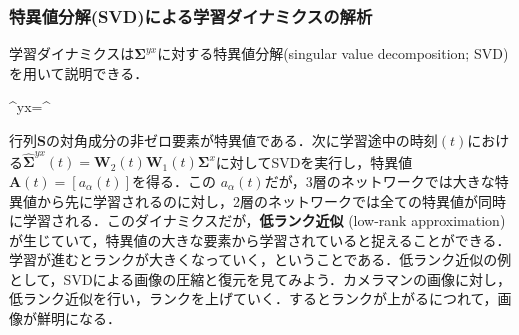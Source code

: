 \subsubsection{特異値分解(SVD)による学習ダイナミクスの解析}
学習ダイナミクスは$ \mathbf{\Sigma}^{yx}$に対する特異値分解(singular value decomposition; SVD)を用いて説明できる．


\mathbf{\Sigma}^{yx}=^\top


行列$ \mathbf{ S}$の対角成分の非ゼロ要素が特異値である．次に学習途中の時刻$(t)$における$\hat{\mathbf{\Sigma}}^{yx}(t)=\mathbf{W}_2 (t) \mathbf{W}_1(t) \mathbf{\Sigma}^{x}$に対してSVDを実行し，特異値$\mathbf{A}(t)=[a_{\alpha}(t)]$を得る．この $a _ {\alpha}(t)$だが，3層のネットワークでは大きな特異値から先に学習されるのに対し，2層のネットワークでは全ての特異値が同時に学習される．このダイナミクスだが，\textbf{低ランク近似} (low-rank approximation)が生じていて，特異値の大きな要素から学習されていると捉えることができる．学習が進むとランクが大きくなっていく，ということである．低ランク近似の例として，SVDによる画像の圧縮と復元を見てみよう．カメラマンの画像に対し，低ランク近似を行い，ランクを上げていく．するとランクが上がるにつれて，画像が鮮明になる．

